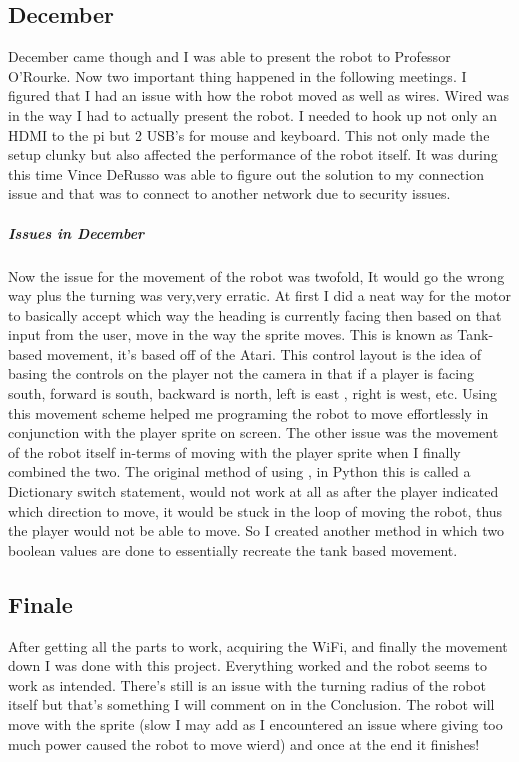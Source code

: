 \documentclass[13ptletterpaper]{paper}
\newcommand\tab[1][1cm]{\hspace*{#1}}
\begin{document}
\begin{flushleft}
	\subsection{December} 
	\tab December came though and I was able to present the robot to Professor O'Rourke. Now two important thing happened in the following meetings. I figured that I had an issue with how the robot moved as well as wires. Wired was in the way I had to actually present the robot. I needed to hook up not only an HDMI to the pi but 2 USB's for mouse and keyboard. This not only made the setup clunky but also affected the performance of the robot itself. It was during this time Vince DeRusso was able to figure out the solution to my connection issue and that was to connect to another network due to security issues. 
	\subparagraph{Issues in December} Now the issue for the movement of the robot was twofold, It would go the wrong way plus the turning was very,very erratic. At first I did a neat way for the motor to basically accept which way the heading is currently facing then based on that input from the user, move in the way the sprite moves. This is known as Tank-based movement, it's based off of the Atari. This control layout is the idea of basing the controls on the player not the camera in that if a player is facing south, forward is south, backward is north, left is east , right is west, etc. Using this movement scheme helped me programing the robot to move effortlessly in conjunction with the player sprite on screen. The other issue was the movement of the robot itself in-terms of moving with the player sprite when I finally combined the two. The original method of using , in Python this is called a Dictionary switch statement, would not work at all as after the player indicated which direction to move, it would be stuck in the loop of moving the robot, thus the player would not be able to move. So I created another method in which two boolean values are done to essentially recreate the tank based movement. 
	\subsection{Finale} 
	\tab After getting all the parts to work, acquiring the WiFi, and finally the movement down I was done with this project. Everything worked and the robot seems to work as intended. There's still is an issue with the turning radius of the robot itself but that's something I will comment on in the Conclusion. The robot will move with the sprite (slow I may add as I encountered an issue where giving too much power caused the robot to move wierd) and once at the end it finishes! 
	

\end{flushleft}
\end{document}
